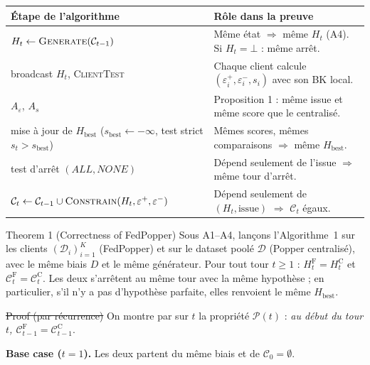 \documentclass[10pt]{article}
\begin{document}
\renewcommand{\arraystretch}{1.25}
\begin{tabular}{@{}L{4.2cm}L{12.2cm}@{}}
\textbf{Étape de l'algorithme} & \textbf{Rôle dans la preuve}\\\hline
$H_t\leftarrow\textsc{Generate}(\mathcal{C}_{t-1})$ & Même état $\Rightarrow$ même $H_t$ (A4). Si $H_t=\bot$ : même arrêt.\\
broadcast $H_t$, \textsc{ClientTest} & Chaque client calcule $(\varepsilon_i^+,\varepsilon_i^-,s_i)$ avec son BK local.\\
$A_\varepsilon$, $A_s$ & Proposition 1 : même issue et même score que le centralisé.\\
mise à jour de $H_{\text{best}}$ ($s_{\text{best}}\leftarrow-\infty$, test strict $s_t>s_{\text{best}}$) & Mêmes scores, mêmes comparaisons $\Rightarrow$ même $H_{\text{best}}$.\\
test d'arrêt $(\mathit{ALL},\mathit{NONE})$ & Dépend seulement de l'issue $\Rightarrow$ même tour d'arrêt.\\
$\mathcal{C}_t\leftarrow\mathcal{C}_{t-1}\cup\textsc{Constrain}(H_t,\varepsilon^+,\varepsilon^-)$ & Dépend seulement de $(H_t,\text{issue})$ $\Rightarrow$ $\mathcal{C}_t$ égaux.\\
\end{tabular}

\begin{enonce}{Theorem 1 (Correctness of FedPopper)}
Sous A1--A4, lançons l'Algorithme~1 sur les clients $(\mathcal{D}_i)_{i=1}^{K}$ (FedPopper) et sur le dataset poolé $\mathcal{D}$ (Popper centralisé),
avec le même biais $D$ et le même générateur. Pour tout tour $t\ge1$ : $H_t^{\mathrm F}=H_t^{\mathrm C}$ et $\mathcal{C}_t^{\mathrm F}=\mathcal{C}_t^{\mathrm C}$.
Les deux s'arrêtent au même tour avec la même hypothèse ; en particulier, s'il n'y a pas d'hypothèse parfaite, elles renvoient le même $H_{\text{best}}$.
\end{enonce}

\st{Proof (par récurrence)}
On montre par  sur $t$ la propriété $\mathcal{P}(t)$ : \emph{au début du tour $t$, $\mathcal{C}_{t-1}^{\mathrm F}=\mathcal{C}_{t-1}^{\mathrm C}$}.

\textbf{Base case ($t=1$).} Les deux partent du même biais et de $\mathcal{C}_0=\emptyset$.
\end{document}
